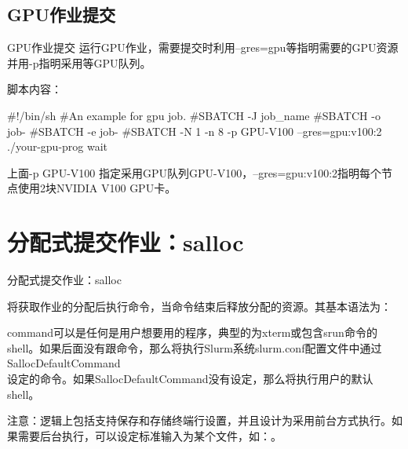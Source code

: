 \subsection{GPU作业提交}
\begin{frame}[fragile]{GPU作业提交}
运行GPU作业，需要提交时利用--gres=gpu等指明需要的GPU资源并用-p指明采用等GPU队列。

脚本内容：
\begin{SH}
#!/bin/sh
#An example for gpu job.
#SBATCH -J job_name
#SBATCH -o job-%
#SBATCH -e job-%
#SBATCH -N 1 -n 8 -p GPU-V100 --gres=gpu:v100:2
./your-gpu-prog
wait
\end{SH}
上面-p GPU-V100 指定采用GPU队列GPU-V100，--gres=gpu:v100:2指明每个节点使用2块NVIDIA V100 GPU卡。
\end{frame}

\section{分配式提交作业：salloc}
\begin{frame}{分配式提交作业：salloc}

将获取作业的分配后执行命令，当命令结束后释放分配的资源。其基本语法为：


command可以是任何是用户想要用的程序，典型的为xterm或包含srun命令的shell。如果后面没有跟命令，那么将执行Slurm系统slurm.conf配置文件中通过SallocDefaultCommand\\设定的命令。如果SallocDefaultCommand没有设定，那么将执行用户的默认shell。

注意：逻辑上包括支持保存和存储终端行设置，并且设计为采用前台方式执行。如果需要后台执行，可以设定标准输入为某个文件，如：。
\end{frame}


